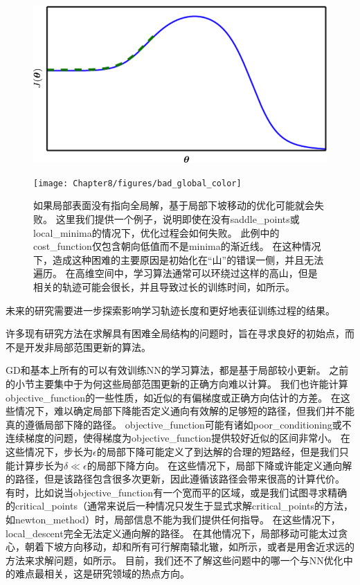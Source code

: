 

\begin{figure}[!htb]
\ifOpenSource
\centerline{\includegraphics[scale=0.5]{images/66.png}}
\else
\centerline{\texttt{[image: Chapter8/figures/bad\_global\_color]}}
\fi
\caption{如果局部表面没有指向全局解，基于局部下坡移动的优化可能就会失败。
这里我们提供一个例子，说明即使在没有\gls{saddle_points}或\gls{local_minima}的情况下，优化过程会如何失败。
此例中的\gls{cost_function}仅包含朝向低值而不是\gls{minima}的渐近线。
在这种情况下，造成这种困难的主要原因是初始化在``山''的错误一侧，并且无法遍历。
在高维空间中，学习算法通常可以环绕过这样的高山，但是相关的轨迹可能会很长，并且导致过长的训练时间，如所示。
}
\label{fig:chap8_bad_global}
\end{figure}


未来的研究需要进一步探索影响学习轨迹长度和更好地表征训练过程的结果。


许多现有研究方法在求解具有困难全局结构的问题时，旨在寻求良好的初始点，而不是开发非局部范围更新的算法。


\gls{GD}和基本上所有的可以有效训练\gls{NN}的学习算法，都是基于局部较小更新。
之前的小节主要集中于为何这些局部范围更新的正确方向难以计算。
我们也许能计算\gls{objective_function}的一些性质，如近似的有偏梯度或正确方向估计的方差。
在这些情况下，难以确定局部下降能否定义通向有效解的足够短的路径，但我们并不能真的遵循局部下降的路径。
\gls{objective_function}可能有诸如\gls{poor_conditioning}或不连续梯度的问题，使得梯度为\gls{objective_function}提供较好近似的区间非常小。
在这些情况下，步长为$\epsilon$的局部下降可能定义了到达解的合理的短路经，但是我们只能计算步长为$\delta \ll \epsilon$的局部下降方向。
在这些情况下，局部下降或许能定义通向解的路径，但是该路径包含很多次更新，因此遵循该路径会带来很高的计算代价。
有时，比如说当\gls{objective_function}有一个宽而平的区域，或是我们试图寻求精确的\gls{critical_points}（通常来说后一种情况只发生于显式求解\gls{critical_points}的方法，如\gls{newton_method}）时，局部信息不能为我们提供任何指导。
在这些情况下，\gls{local_descent}完全无法定义通向解的路径。
在其他情况下，局部移动可能太过贪心，朝着下坡方向移动，却和所有可行解南辕北辙，如所示，或者是用舍近求远的方法来求解问题，如所示。
目前，我们还不了解这些问题中的哪一个与\gls{NN}优化中的难点最相关，这是研究领域的热点方向。

